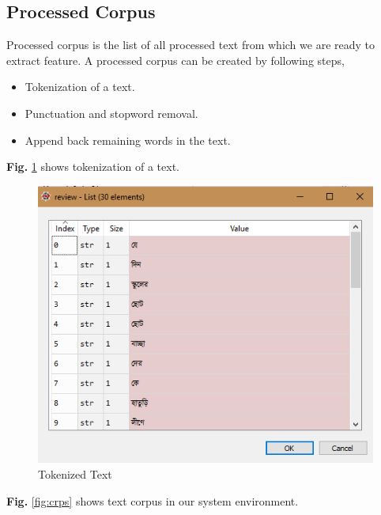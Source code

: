 \subsection{Processed Corpus}
Processed corpus is the list of all processed text from which we are ready to extract feature. A processed corpus can be created by following steps,
\begin{itemize}
    \item Tokenization of a text.
    \item Punctuation and stopword removal.
    \item Append back remaining words in the text.
\end{itemize}
\textbf{Fig.} \ref{fig:tkn} shows tokenization of a text.
\begin{figure}[h!]
    \centering
    \includegraphics[scale=0.6]{Figures/tokenize.PNG}
    \caption{Tokenized Text}
    \label{fig:tkn}
\end{figure}
\par\noindent
\textbf{Fig.} \ref{fig:crps} shows text corpus in our system environment.
